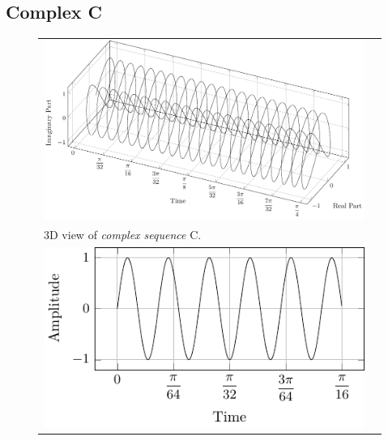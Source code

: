 \documentclass[../../course]{subfiles}
\begin{document}
\subsection{Complex C}

\begin{figure} [H]

    \renewcommand{\arraystretch}{0.75}
    \centering
    \begin{NiceTabularX} {\textwidth} {
            *{2}{>{\centering\arraybackslash}X}
        }

         {
             {
                \includegraphics[height = \textheight] {tikzpics/plotComplexC.pdf}
            }
        }

        &
        \\

         {
            \vbox{
                 {3D view of \emph{complex sequence} C.}
                \label{plt:cmplxC}
            }
        }

        &
        \\

         {
             {
                \includegraphics[height = \textheight] {tikzpics/plotShortX1.pdf}
            }
        }


\end{NiceTabularX}
\end{figure}
\end{document}
